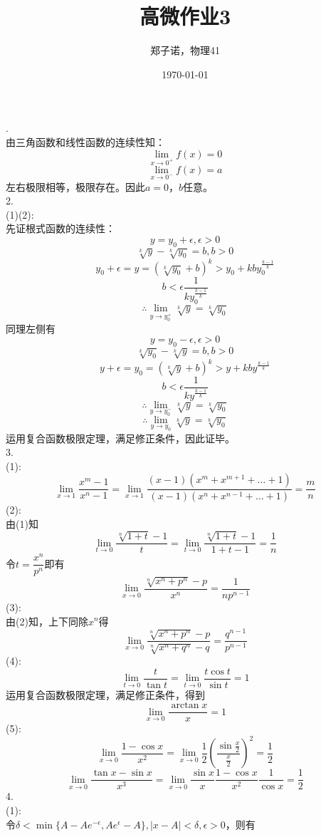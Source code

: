 \documentclass{ctexart}
\title{高微作业3}
\author{郑子诺，物理41}
\date{\today}
\begin{document}
\maketitle
{}.\\
由三角函数和线性函数的连续性知：
\[\lim\limits_{x\rightarrow0^+}f(x)=0\]
\[\lim\limits_{x\rightarrow0^-}f(x)=a\]
左右极限相等，极限存在。因此$a=0$，$b$任意。\\
2.\\
(1)(2):\\
先证根式函数的连续性：
\[y=y_0+\epsilon,\epsilon>0\]
\[\sqrt[k]{y}-\sqrt[k]{y_0}=b,b>0\]
\[y_0+\epsilon=y=(\sqrt[k]{y_0}+b)^k>y_0+kby_0^{\frac{k-1}{k}}\]
\[b<\epsilon\frac{1}{ky_0^{\frac{k-1}{k}}}\]
\[\therefore\lim\limits_{y\rightarrow y_0^+}\sqrt[k]{y}=\sqrt[k]{y_0}\]
同理左侧有
\[y=y_0-\epsilon,\epsilon>0\]
\[\sqrt[k]{y_0}-\sqrt[k]{y}=b,b>0\]
\[y+\epsilon=y_0=(\sqrt[k]{y}+b)^k>y+kby^{\frac{k-1}{k}}\]
\[b<\epsilon\frac{1}{ky^{\frac{k-1}{k}}}\]
\[\therefore\lim\limits_{y\rightarrow y_0^-}\sqrt[k]{y}=\sqrt[k]{y_0}\]
\[\therefore\lim\limits_{y\rightarrow y_0}\sqrt[k]{y}=\sqrt[k]{y_0}\]
运用复合函数极限定理，满足修正条件\uppercase\expandafter{}，因此证毕。\\
3.\\
(1):
\[\lim\limits_{x\rightarrow1}\frac{x^m-1}{x^n-1}=\lim\limits_{x\rightarrow1}\frac{(x-1)(x^m+x^{m+1}+\dots+1)}{(x-1)(x^n+x^{n-1}+\dots+1)}=\frac{m}{n}\]
(2):\\
由(1)知
\[\lim\limits_{t\rightarrow0}\frac{\sqrt[n]{1+t}-1}{t}=\lim\limits_{t\rightarrow0}\frac{\sqrt[n]{1+t}-1}{1+t-1}=\frac{1}{n}\]
令$t=\dfrac{x^n}{p^n}$即有
\[\lim\limits_{x\rightarrow0}\frac{\sqrt[n]{x^n+p^n}-p}{x^n}=\frac{1}{np^{n-1}}\]
(3):\\
由(2)知，上下同除$x^n$得
\[\lim\limits_{x\rightarrow0}\frac{\sqrt[n]{x^n+p^n}-p}{\sqrt[n]{x^n+q^n}-q}=\frac{q^{n-1}}{p^{n-1}}\]
(4):
\[\lim\limits_{t\rightarrow0}\frac{t}{\tan t}=\lim\limits_{t\rightarrow0}\frac{t\cos t}{\sin t}=1\]
运用复合函数极限定理，满足修正条件\uppercase\expandafter{}，得到
\[\lim\limits_{x\rightarrow0}\frac{\arctan x}{x}=1\]
(5):
\[\lim\limits_{x\rightarrow0}\frac{1-\cos x}{x^2}=\lim\limits_{x\rightarrow0}\frac{1}{2}(\frac{\sin\frac{x}{2}}{\frac{x}{2}})^2=\frac{1}{2}\]
\[\lim\limits_{x\rightarrow0}\frac{\tan x-\sin x}{x^3}=\lim\limits_{x\rightarrow0}\frac{\sin x}{x}\frac{1-\cos x}{x^2}\frac{1}{\cos x}=\frac{1}{2}\]
4.\\
(1):\\
令$\delta<\min\{A-Ae^{-\epsilon},Ae^{\epsilon}-A\},|x-A|<\delta,\epsilon>0$，则有
\end{document}
